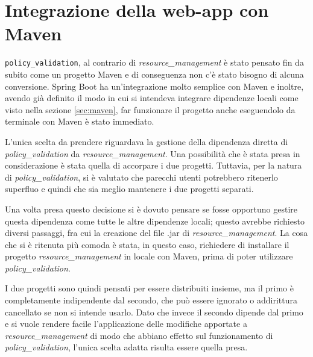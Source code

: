 \section{Integrazione della web-app con Maven}
\texttt{policy\_validation}, al contrario di \emph{resource\_management} è stato pensato fin da subito come un progetto Maven e di conseguenza non c'è stato bisogno di alcuna conversione. Spring Boot ha un'integrazione molto semplice con Maven e inoltre, avendo già definito il modo in cui si intendeva integrare dipendenze locali come visto nella sezione \ref{sec:maven}, far funzionare il progetto anche eseguendolo da terminale con Maven è stato immediato.\par
L'unica scelta da prendere riguardava la gestione della dipendenza diretta di \emph{policy\_validation} da \emph{resource\_management}. Una possibilità che è stata presa in considerazione è stata quella di accorpare i due progetti. Tuttavia, per la natura di \emph{policy\_validation}, si è valutato che parecchi utenti potrebbero ritenerlo superfluo e quindi che sia meglio mantenere i due progetti separati.\par
Una volta presa questo decisione si è dovuto pensare se fosse opportuno gestire questa dipendenza come tutte le altre dipendenze locali; questo avrebbe richiesto diversi passaggi, fra cui la creazione del file .jar di \emph{resource\_management}. La cosa che si è ritenuta più comoda è stata, in questo caso, richiedere di installare il progetto \emph{resource\_management} in locale con Maven, prima di poter utilizzare \emph{policy\_validation}.\par
I due progetti sono quindi pensati per essere distribuiti insieme, ma il primo è completamente indipendente dal secondo, che può essere ignorato o addirittura cancellato se non si intende usarlo. Dato che invece il secondo dipende dal primo e si vuole rendere facile l'applicazione delle modifiche apportate a \emph{resource\_management} di modo che abbiano effetto sul funzionamento di \emph{policy\_validation}, l'unica scelta adatta risulta essere quella presa.

